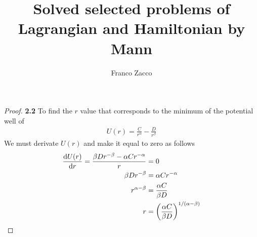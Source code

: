\documentclass[11pt]{article}
\title{\textbf{Solved selected problems of Lagrangian and Hamiltonian by Mann}}
\author{Franco Zacco}
\date{}
\theoremstyle{definition}
\begin{document}
\maketitle
\thispagestyle{empty}

\begin{proof}{\textbf{2.2}}
To find the $r$ value that corresponds to the minimum of the potential well
of
\begin{align*}
    U(r) = \frac{C}{r^\alpha} - \frac{D}{r^\beta}
\end{align*}
We must derivate $U(r)$ and make it equal to zero as follows
\begin{align*}
    \dv{U(r)}{r} = \frac{\beta D r^{-\beta} - \alpha C r^{-\alpha}}{r} &= 0\\
    \beta D r^{-\beta} &= \alpha C r^{-\alpha}\\
    r^{\alpha-\beta} &= \frac{\alpha C}{\beta D}\\
    r &= \bigg(\frac{\alpha C}{\beta D}\bigg)^{1/(\alpha - \beta)}
\end{align*}
\end{proof}
\end{document}
